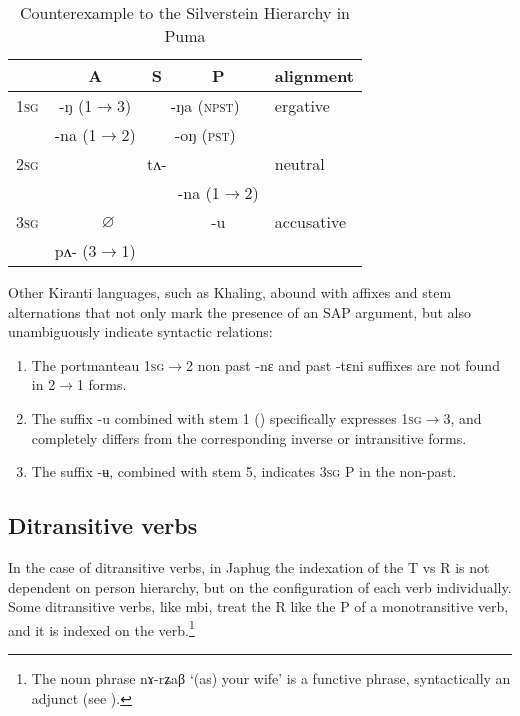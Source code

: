 \documentclass[oldfontcommands,oneside,a4paper,11pt]{article}
\newcommand{\ipa}[1]{{\phon \mbox{#1}}} %
\newcommand{\grise}[1]{\cellcolor{lightgray}\textbf{#1}}
\begin{document}
\begin{table}[H]
\caption{Counterexample to the Silverstein Hierarchy in Puma} \label{tab:silverstein} \centering
\begin{tabular}{l|c|c|c|l}
\toprule
& A & S & P & alignment\\
\hline
\textsc{1sg}& \ipa{-ŋ} (1$\rightarrow$3)& \multicolumn{2}{|c|}{\ipa{-ŋa} \grise{}(\textsc{npst})}  &ergative\\
 & \ipa{-na} (1$\rightarrow$2)& \multicolumn{2}{|c|}{\ipa{-oŋ} \grise{}(\textsc{pst})} &\\
\hline
 \textsc{2sg} & \multicolumn{3}{c|}{\ipa{tʌ-}}& neutral\\
 \cline{4-4}
 &\multicolumn{2}{c|}{}&\ipa{-na} (1$\rightarrow$2)&\\
 \hline
  \textsc{3sg} & \multicolumn{2}{c|}{$\varnothing$} & \ipa{-u} &accusative\\
   \cline{2-2}
  &\ipa{pʌ-}  (3$\rightarrow$1) & &\\
  \bottomrule
\end{tabular}
\end{table}

Other Kiranti languages, such as Khaling, abound with affixes and stem alternations that not only mark the presence of an SAP argument, but also unambiguously indicate syntactic relations:

\begin{enumerate}
\item The portmanteau \textsc{1sg$\rightarrow$2} non past \ipa{-nɛ} and past \ipa{-tɛni} suffixes are not found in 2$\rightarrow$1 forms.
\item The suffix \ipa{-u}  combined with stem 1 (\citealt[1104]{jacques12khaling}) specifically expresses \textsc{1sg$\rightarrow$3}, and completely differs from the corresponding inverse or intransitive forms.
\item The suffix \ipa{-ʉ}, combined with stem 5, indicates \textsc{3sg} P in the non-past.
\end{enumerate}


\subsection{Ditransitive verbs}
In the case of ditransitive verbs, in Japhug the indexation of the T vs R is not dependent on person hierarchy, but on the configuration of each verb individually. Some ditransitive verbs, like \ipa{mbi}, treat the R like the P of a monotransitive verb, and it is indexed on the verb.\footnote{The noun phrase \ipa{nɤ-rʑaβ} `(as) your wife' is a functive phrase, syntactically an adjunct (see \citealt{creissels14functive}).}
\end{document}
